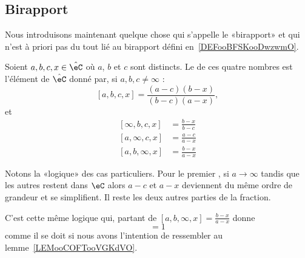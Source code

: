 \subsection{Birapport}

Nous introduisons maintenant quelque chose qui s'appelle le «birapport» et qui n'est à priori pas du tout lié au birapport défini en~\ref{DEFooBFSKooDwzwmO}.

\begin{definition}        \label{DEFooQYHVooMZwQMB}
	Soient \( a,b,c,x\in \hat\eC\) où \( a\), \( b\) et \( c\) sont distincts. Le  de ces quatre nombres est l'élément de \( \hat\eC\) donné par, si \( a,b,c\neq \infty\) :
	\begin{equation}        \label{EQooQJWZooOXKslh}
		[a,b,c,x]=\frac{ (a-c)(b-x) }{ (b-c)(a-x) },
	\end{equation}
	et
	\begin{subequations}
		\begin{align}
			[\infty,b,c,x] & =\frac{ b-x }{ b-c } \label{SUBEQooNSONooYUhuzB} \\
			[a,\infty,c,x] & =\frac{a-c}{a-x}                                 \\
			[a,b,\infty,x] & =\frac{ b-x }{ a-x }
		\end{align}
	\end{subequations}
\end{definition}

\begin{normaltext}
	Notons la «logique» des cas particuliers. Pour le premier%
	, si \( a\to\infty\) tandis que les autres restent dans \( \eC\) alors \( a-c\) et \( a-x\) deviennent du même ordre de grandeur et se simplifient. Il reste les deux autres parties de la fraction.

	C'est cette même logique qui, partant de \( [a,b,\infty,x]=\frac{ b-x }{ a-x }\) donne
	\begin{equation}
		[a,b,\infty,\infty]=1
	\end{equation}
	comme il se doit si nous avons l'intention de ressembler au lemme~\ref{LEMooCOFTooVGKdVO}.
\end{normaltext}

